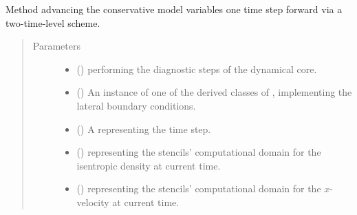 \documentclass[letterpaper,10pt,english]{sphinxmanual}
\begin{document}
\begin{fulllineitems}
\begin{fulllineitems}
\label{\detokenize{api:dycore.prognostic_isentropic.PrognosticIsentropicTL2.step_forward}}
Method advancing the conservative model variables one time step forward via a two-time-level scheme.
\begin{quote}\begin{description}
\item[{Parameters}] \leavevmode\begin{itemize}
\item {} 
 () \textendash{} {\hyperref[\detokenize{api:dycore.diagnostic_isentropic.DiagnosticIsentropic}]{}} performing the diagnostic steps
of the dynamical core.

\item {} 
 () \textendash{} An instance of one of the derived classes of {\hyperref[\detokenize{api:dycore.horizontal_boundary.HorizontalBoundary}]{}},
implementing the lateral boundary conditions.

\item {} 
 () \textendash{} A  representing the time step.

\item {} 
 () \textendash{}  representing the stencils’ computational domain for the isentropic density
at current time.

\item {} 
 () \textendash{}  representing the stencils’ computational domain for the \(x\)-velocity
at current time.


\end{itemize}
\end{description}
\end{quote}
\end{fulllineitems}
\end{fulllineitems}
\end{document}
